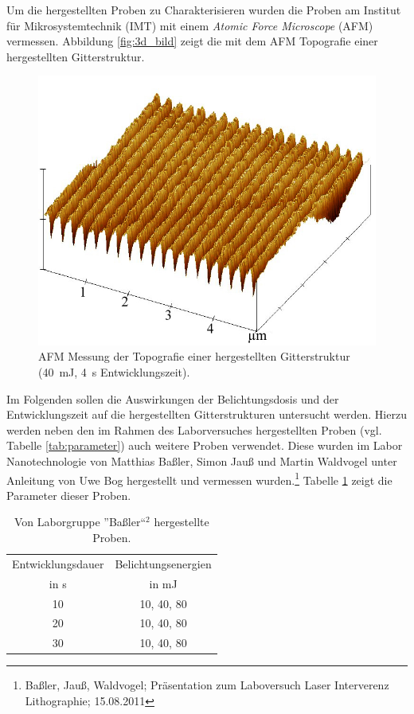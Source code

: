 Um die hergestellten Proben zu Charakterisieren wurden die Proben am Institut für Mikrosystemtechnik (IMT) mit einem \textit{Atomic Force Microscope} (AFM) vermessen. Abbildung \ref{fig:3d_bild} zeigt die mit dem AFM Topografie einer hergestellten Gitterstruktur.

\begin{figure}%
\centering
\includegraphics[width=.5\columnwidth]{Grafiken/3d_bild.jpg}%
\caption{AFM Messung der Topografie einer hergestellten Gitterstruktur (40~mJ, 4~s Entwicklungszeit).}%
\label{}%
\end{figure}


Im Folgenden sollen die Auswirkungen der Belichtungsdosis und der Entwicklungszeit auf die hergestellten Gitterstrukturen untersucht werden. Hierzu werden neben den im Rahmen des Laborversuches hergestellten Proben (vgl. Tabelle \ref{tab:parameter}) auch weitere Proben verwendet. Diese wurden im Labor Nanotechnologie von Matthias Baßler, Simon Jauß und Martin Waldvogel unter Anleitung von Uwe Bog hergestellt und vermessen wurden.\footnote[2]{Baßler, Jauß, Waldvogel; Präsentation zum Laboversuch Laser Interverenz Lithographie; 15.08.2011} Tabelle \ref{tab:Referenz} zeigt die Parameter dieser Proben.

\begin{table}[h]%
\centering
\caption{Von Laborgruppe ''Baßler``$^2$ hergestellte Proben.}
\begin{tabular}{cc}

\toprule
Entwicklungsdauer	& Belichtungsenergien\\
in s	& in mJ\\
\midrule
10 & 10, 40, 80\\
20  & 10, 40, 80\\
30 & 10, 40, 80\\
\bottomrule 
\end{tabular}
\label{tab:Referenz}
\end{table}

